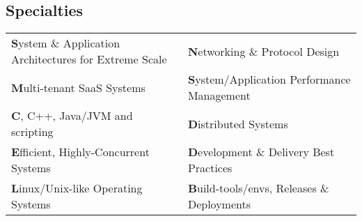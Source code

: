 \documentclass[margin,line]{res}
\begin{document}
\begin{resume}
\section{\sc Specialties}
\vspace{.4cm}
\begin{tabular}{@{}p{3.3in}p{3.3in}}
{\bf S}ystem \& Application Architectures for Extreme Scale  &  {\bf N}etworking \& Protocol Design                        \\ [0.2cm]
{\bf M}ulti-tenant SaaS Systems                              &  {\bf S}ystem/Application Performance Management            \\ [0.2cm]
{\bf C}, C++, Java/JVM and scripting                         &  {\bf D}istributed Systems                                  \\ [0.2cm]
{\bf E}fficient, Highly-Concurrent Systems                   &  {\bf D}evelopment \& Delivery Best Practices               \\ [0.2cm]
{\bf L}inux/Unix-like Operating Systems                      &  {\bf B}uild-tools/envs, Releases \& Deployments
\end{tabular}


\end{resume}
\end{document}
